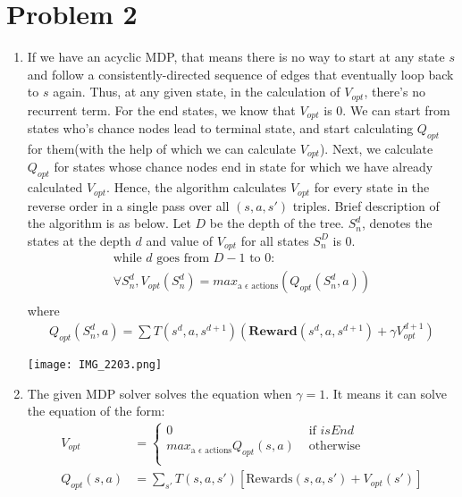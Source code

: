 \documentclass[12pt]{article}
\begin{document}
\section*{Problem 2}

\begin{enumerate}[label=(\alph*)]
	\addtocounter{enumi}{1}
	\item If we have an acyclic MDP, that means there is no way to start at any state $s$ and follow a consistently-directed sequence of edges that eventually loop back to $s$ again. Thus, at any given state, in the calculation of $V_{opt}$, there's no recurrent term. For the end states, we know that $V_{opt}$ is $0$. We can start from states who's chance nodes lead to terminal state, and start calculating $Q_{opt}$ for them(with the help of which we can calculate $V_{opt}$). Next, we calculate $Q_{opt}$ for states whose chance nodes end in state for which we have already calculated $V_{opt}$. Hence, the algorithm calculates $V_{opt}$ for every state in the reverse order in a single pass over all $(s,a,s')$ triples.
	Brief description of the algorithm is as below. Let $D$ be the depth of the tree. $S_{n}^d$, denotes the states at the depth $d$ and value of $V_{opt}$ for all states $S_{n}^D$ is 0.
	\begin{align*}
	\text{while $d$ goes from $D-1$ to $0$:} \\
	\forall S_{n}^d, V_{opt}(S_{n}^d) = max_{\text{a }\epsilon \text{ actions}}(Q_{opt}(S_{n}^d, a)) \\
	\end{align*}	
	where \\
	\begin{align*}
	Q_{opt}(S_{n}^d, a) = \sum T(s^d,a,s^{d+1}) (\textbf{Reward}(s^d,a,s^{d+1}) + \gamma V_{opt}^{d+1})
	\end{align*}
	\begin{center}
	\texttt{[image: IMG\_2203.png]}
	\end{center}
	\item The given MDP solver solves the equation when $\gamma = 1$. It means it can solve the equation of the form:
	\begin{align*}
	V_{opt} &= \begin{cases}
	0 & \text{  if $isEnd$} \\
	max_{\text{a } \epsilon \text{ actions}} Q_{opt}(s, a) & \text{  otherwise} \\
	\end{cases} \\
	Q_{opt} (s, a) &= \sum_{s'} T(s, a, s')[\text{Rewards} (s,a,s') + V_{opt}(s')]

\end{align*}
\end{enumerate}
\end{document}
